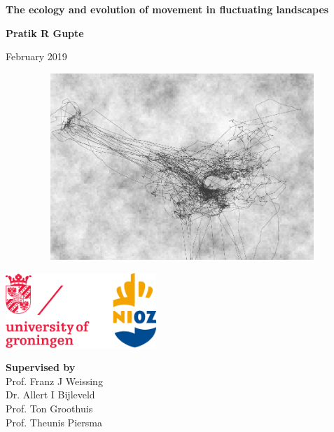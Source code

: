 


	
\begin{titlepage}
\begin{center}
	
\doublespacing

\huge{\textbf{\textsf{The ecology and evolution of movement in fluctuating landscapes}}}

\huge{\textbf{\textsf{Pratik R Gupte}}}

\large{\textsf{February 2019}}

\begin{figure}
	\hfill\includegraphics[width=600pt, height = 200pt]{cover_image.pdf}\hspace*{\fill}
	
\end{figure}
\end{center}

\vspace{1.5in}

\begin{minipage}[b]{0.5\textwidth}
	\begin{flushleft}
	\includegraphics[width=\textwidth, height = 80pt]{logo_affils.eps}
	\end{flushleft}
\end{minipage}%
%
\begin{minipage}[b]{0.5\textwidth}
	\begin{flushright}
		{\textbf{\textsf{Supervised by}}} \\
		\textsf{\large{Prof. Franz J Weissing}} \\
		\textsf{\large{Dr. Allert I Bijleveld}} \\
		\textsf{\large{Prof. Ton Groothuis}} \\
		\textsf{\large{Prof. Theunis Piersma}}
	\end{flushright}
\end{minipage}%
 	

\end{titlepage}

